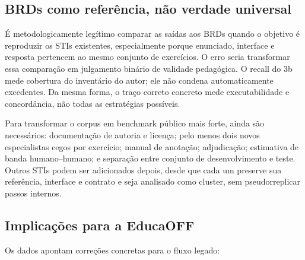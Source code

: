 \documentclass[11pt,a4paper]{article}
\begin{document}
\subsection{BRDs como referência, não verdade universal}

É metodologicamente legítimo comparar as saídas aos BRDs quando o objetivo é reproduzir os STIs existentes, especialmente porque enunciado, interface e resposta pertencem ao mesmo conjunto de exercícios. O erro seria transformar essa comparação em julgamento binário de validade pedagógica. O recall do 3b mede cobertura do inventário do autor; ele não condena automaticamente excedentes. Da mesma forma, o traço correto concreto mede executabilidade e concordância, não todas as estratégias possíveis.

Para transformar o corpus em benchmark público mais forte, ainda são necessários: documentação de autoria e licença; pelo menos dois novos especialistas cegos por exercício; manual de anotação; adjudicação; estimativa de banda humano--humano; e separação entre conjunto de desenvolvimento e teste. Outros STIs podem ser adicionados depois, desde que cada um preserve sua referência, interface e contrato e seja analisado como cluster, sem pseudorreplicar passos internos.

\subsection{Implicações para a EducaOFF}

Os dados apontam correções concretas para o fluxo legado:
\end{document}
